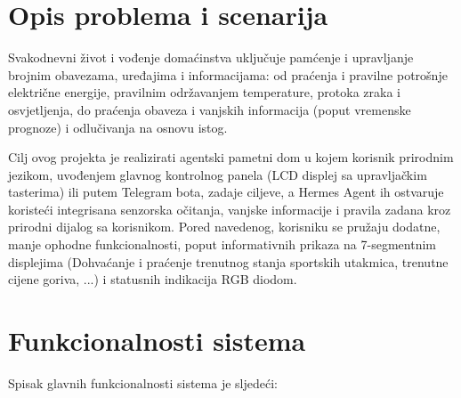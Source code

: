 \documentclass[11pt,a4paper]{article}
\begin{document}
\section{Opis problema i scenarija}

Svakodnevni život i vođenje domaćinstva uključuje pamćenje i upravljanje brojnim obavezama, uređajima i informacijama:
od praćenja i pravilne potrošnje električne energije, pravilnim održavanjem temperature, protoka zraka i osvjetljenja, do praćenja obaveza i vanjskih informacija (poput vremenske prognoze) i odlučivanja na osnovu istog.

Cilj ovog projekta je realizirati agentski pametni dom u kojem korisnik prirodnim jezikom, uvođenjem glavnog kontrolnog panela (LCD displej sa upravljačkim tasterima)
ili putem Telegram bota, zadaje ciljeve, a Hermes Agent ih ostvaruje koristeći integrisana senzorska očitanja, vanjske informacije i pravila zadana kroz prirodni dijalog sa korisnikom.
Pored navedenog, korisniku se pružaju dodatne, manje ophodne funkcionalnosti, poput informativnih prikaza na 7-segmentnim displejima (Dohvaćanje i praćenje trenutnog stanja sportskih utakmica, trenutne cijene goriva, ...) i statusnih indikacija RGB diodom.

\section{Funkcionalnosti sistema}

Spisak glavnih funkcionalnosti sistema je sljedeći:
\end{document}
